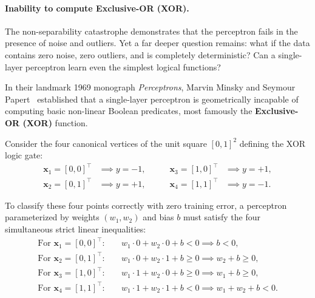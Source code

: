 \paragraph{Inability to compute Exclusive-OR (XOR).}
The non-separability catastrophe demonstrates that the perceptron fails in the presence of noise and outliers. Yet a far deeper question remains: what if the data contains zero noise, zero outliers, and is completely deterministic? Can a single-layer perceptron learn even the simplest logical functions?

In their landmark 1969 monograph \textit{Perceptrons}, Marvin Minsky and Seymour Papert~\cite{minsky1969perceptrons} established that a single-layer perceptron is geometrically incapable of computing basic non-linear Boolean predicates, most famously the \textbf{Exclusive-OR (XOR)} function.

Consider the four canonical vertices of the unit square $[0, 1]^2$ defining the XOR logic gate:
\begin{equation}
\begin{aligned}
\mathbf{x}_1 = [0, 0]^\top &\implies y = -1, \\
\mathbf{x}_2 = [0, 1]^\top &\implies y = +1,
\end{aligned}
\qquad
\begin{aligned}
\mathbf{x}_3 = [1, 0]^\top &\implies y = +1, \\
\mathbf{x}_4 = [1, 1]^\top &\implies y = -1.
\end{aligned}
\label{eq:xor_dataset}
\end{equation}

To classify these four points correctly with zero training error, a perceptron parameterized by weights $(w_1, w_2)$ and bias $b$ must satisfy the four simultaneous strict linear inequalities:
\begin{align}
\text{For } \mathbf{x}_1 = [0, 0]^\top: \quad & w_1 \cdot 0 + w_2 \cdot 0 + b < 0 \implies b < 0, \label{eq:xor_ineq1} \\
\text{For } \mathbf{x}_2 = [0, 1]^\top: \quad & w_1 \cdot 0 + w_2 \cdot 1 + b \ge 0 \implies w_2 + b \ge 0, \label{eq:xor_ineq2} \\
\text{For } \mathbf{x}_3 = [1, 0]^\top: \quad & w_1 \cdot 1 + w_2 \cdot 0 + b \ge 0 \implies w_1 + b \ge 0, \label{eq:xor_ineq3} \\
\text{For } \mathbf{x}_4 = [1, 1]^\top: \quad & w_1 \cdot 1 + w_2 \cdot 1 + b < 0 \implies w_1 + w_2 + b < 0. \label{eq:xor_ineq4}
\end{align}

